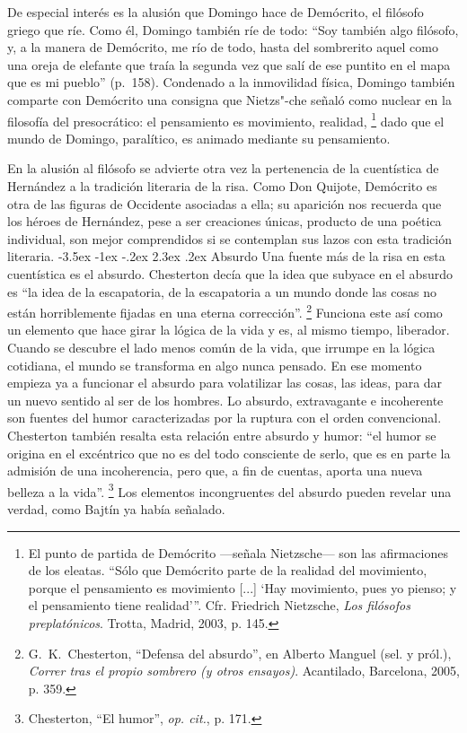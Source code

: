 \documentclass[14pt,twoside,final]{extbook} %
\makeatletter
\let\oldfootnote\footnote
\renewcommand\footnote[1]{%
\oldfootnote{\hspace{1mm}#1}}
\renewcommand\section{\@startsection {section}{1}{\z@}%
                                     {-3.5ex \@plus -1ex \@minus -.2ex}%
                                     {2.3ex \@plus .2ex}%
                                     {\normalfont\large\bfseries\sc}}
\makeatother
\begin{document}
De especial interés es la alusión que Domingo hace de Demócrito, el filósofo griego que ríe. Como él, Domingo también ríe de todo: ``Soy también algo filósofo, y, a la manera de Demócrito, me río de todo, hasta del sombrerito aquel como una oreja de elefante que traía la segunda vez que salí de ese puntito en el mapa que es mi pueblo'' (p.~158). Condenado a la inmovilidad física, Domingo también comparte con Demócrito una consigna que Nietzs"-che señaló como nuclear en la filosofía del presocrático: el pensamiento es movimiento, realidad,\footnote{El punto de partida de Demócrito ---señala Nietzsche--- son las afirmaciones de los eleatas. ``Sólo que Demócrito parte de la realidad del movimiento, porque el pensamiento es movimiento [...] `Hay movimiento, pues yo pienso; y el pensamiento tiene realidad'{}''. Cfr. Friedrich Nietzsche, \emph{Los filósofos preplatónicos}. Trotta, Madrid, 2003, p. 145.} dado que el mundo de Domingo, paralítico, es animado mediante su pensamiento.

En la alusión al filósofo se advierte otra vez la pertenencia de la cuentística de Hernández a la tradición literaria de la risa. Como Don Quijote, Demócrito es otra de las figuras de Occidente asociadas a ella; su aparición nos recuerda que los héroes de Hernández, pese a ser creaciones únicas, producto de una poética individual, son mejor comprendidos si se contemplan sus lazos con esta tradición literaria.
\section{Absurdo}\label{sec:absurdo}
Una fuente más de la risa en esta cuentística es el absurdo. Chesterton decía que la idea que subyace en el absurdo es ``la idea de la escapatoria, de la escapatoria a un mundo donde las cosas no están horriblemente fijadas en una eterna corrección''.\footnote{G.~K.~Chesterton, ``Defensa del absurdo'', en Alberto Manguel (sel. y pról.), \emph{Correr tras el propio sombrero (y otros ensayos)}. Acantilado, Barcelona, 2005, p. 359.} Funciona este así como un elemento que hace girar la lógica de la vida y es, al mismo tiempo, liberador. Cuando se descubre el lado menos común de la vida, que irrumpe en la lógica cotidiana, el mundo se transforma en algo nunca pensado. En ese momento empieza ya a funcionar el absurdo para volatilizar las cosas, las ideas, para dar un nuevo sentido al ser de los hombres. Lo absurdo, extravagante e incoherente son fuentes del humor caracterizadas por la ruptura con el orden convencional. Chesterton también resalta esta relación entre absurdo y humor: ``el humor se origina en el excéntrico que no es del todo consciente de serlo, que es en parte la admisión de una incoherencia, pero que, a fin de cuentas, aporta una nueva belleza a la vida''.\footnote{Chesterton, ``El humor'', \emph{op. cit.}, p. 171.} Los elementos incongruentes del absurdo pueden revelar una verdad, como Bajtín ya había señalado.
\end{document}
